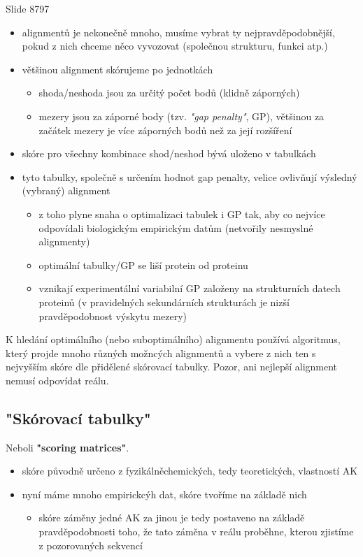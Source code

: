 \documentclass[DIV=8]{scrreprt}
\begin{document}
Slide 8797
\begin{itemize}
    \item alignmentů je nekonečně mnoho, musíme vybrat ty nejpravděpodobnější, pokud z nich chceme něco vyvozovat (společnou strukturu, funkci atp.)
    \item většinou alignment skórujeme po jednotkách
\begin{itemize}
    \item shoda/neshoda jsou za určitý počet bodů (klidně záporných)
    \item mezery jsou za záporné body (tzv. \emph{"gap penalty"}, GP), většinou za začátek mezery je více záporných bodů než za její rozšíření
\end{itemize}

    \item skóre pro všechny kombinace shod/neshod bývá uloženo v tabulkách
    \item tyto tabulky, společně s určením hodnot gap penalty, velice ovlivňují výsledný (vybraný) alignment
\begin{itemize}
    \item z toho plyne snaha o optimalizaci tabulek i GP tak, aby co nejvíce odpovídali biologickým empirickým datům (netvořily nesmyslné alignmenty)
    \item optimální tabulky/GP se liší protein od proteinu
    \item vznikají experimentální variabilní GP založeny na strukturních datech proteinů (v pravidelných sekundárních strukturách je nizší pravděpodobnost výskytu mezery)
\end{itemize}

\end{itemize}


K hledání optimálního (nebo suboptimálního) alignmentu používá algoritmus, který projde mnoho různých možncých alignmentů a vybere z nich ten s nejvyšším skóre dle přidělené skórovací tabulky. Pozor, ani nejlepší alignment nemusí odpovídat reálu.

\subsection{"Skórovací tabulky"}

Neboli \textbf{"scoring matrices"}.

\begin{itemize}
    \item skóre původně určeno z fyzikálněchemických, tedy teoretických, vlastností AK
    \item nyní máme mnoho empirickcýh dat, skóre tvoříme na základě nich
\begin{itemize}
    \item skóre záměny jedné AK za jinou je tedy postaveno na základě pravděpodobnosti toho, že tato záměna v reálu proběhne, kterou zjistíme z pozorovaných sekvencí
\end{itemize}

\end{itemize}
\end{document}
